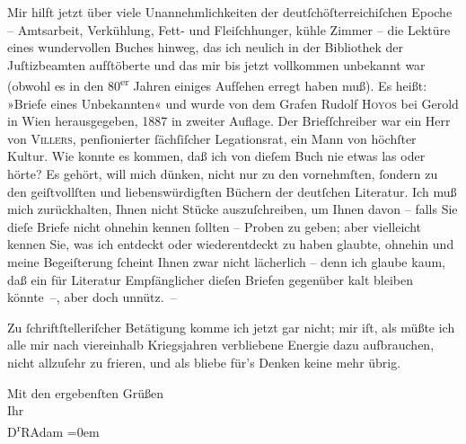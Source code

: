 \pstart
           Mir hilft jetzt über viele Unannehmlichkeiten der deutſchöſterreichiſchen Epoche – Amtsarbeit, Verkühlung, Fett- und
               Fleiſchhunger, kühle Zimmer – die Lektüre eines wundervollen Buches hinweg, das ich
               neulich in der Bibliothek der Juſtizbeamten
               aufſtöberte und das mir bis jetzt vollkommen unbekannt war (obwohl es in den
                     80\textsuperscript{er} Jahren einiges Aufſehen erregt
               haben muß). Es heißt: »Briefe eines Unbekannten«
               und wurde von dem Grafen Rudolf \textsc{Hoyos} bei Gerold in Wien herausgegeben, 1887 in zweiter Auflage. Der Briefſchreiber
               war ein Herr von \textsc{Villers}, penſionierter ſächſiſcher Legationsrat,
               ein Mann von höchſter Kultur. Wie konnte es kommen, daß ich von dieſem Buch nie etwas
               las oder hörte? Es gehört, will mich dünken, nicht nur zu den vornehmſten, ſondern zu
               den geiſtvollſten und liebenswürdigſten Büchern der deutſchen {\pb}Literatur. Ich muß mich zurückhalten,
               Ihnen nicht Stücke auszuſchreiben, um Ihnen davon – falls Sie dieſe Briefe nicht
               ohnehin kennen ſollten – Proben zu geben; aber vielleicht kennen Sie, was ich
               entdeckt oder wiederentdeckt zu haben glaubte, ohnehin und meine Begeiſterung ſcheint
               Ihnen zwar nicht lächerlich – denn ich glaube kaum, daß ein für Literatur
               Empfänglicher dieſen Briefen gegenüber kalt bleiben könnte –, aber doch unnütz. –\pend
           
\pstart
           Zu ſchriftſtelleriſcher Betätigung komme ich jetzt gar nicht; mir iſt, als müßte ich
               alle mir nach viereinhalb Kriegsjahren verbliebene Energie dazu aufbrauchen, nicht
               allzuſehr zu frieren, und als bliebe für’s Denken keine mehr übrig.\pend
           
\pstart
           Mit den ergebenſten Grüßen{\\[\baselineskip]}Ihr{\\[\baselineskip]}\spacefill\mbox{D\textsuperscript{r}RAdam}\pend
           \leftskip=0em{}\endnumbering{}  
      